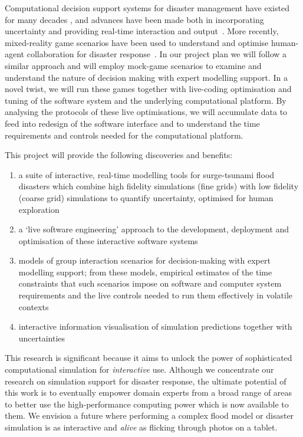 Computational decision support systems for disaster management have
existed for many decades \parencite{wallaceDecision1985}, and
advances have been made both in incorporating
uncertainty \parencite{thompsonSocial2014,nealeNavigating2015}
and providing real-time interaction and
output~\parencite{yuSupport2006}. More recently, mixed-reality game
scenarios have been used to understand and optimise human-agent
collaboration for disaster response~\parencite{ramchurn2016human}. In
our project plan we will follow a similar approach and will employ
mock-game scenarios to examine and understand the nature of decision
making with expert modelling support. In a novel twist, we will run
these games together with live-coding optimisation and tuning of the
software system and the underlying computational platform. By
analysing the protocols of these live optimisations, we will
accumulate data to feed into redesign of the software interface and to
understand the time requirements and controls needed for the
computational platform.

\medskip
This project will provide the following discoveries and benefits:
\begin{enumerate}

\item a suite of interactive, real-time modelling tools for
  surge-tsunami flood disasters which combine high fidelity
  simulations (fine grids) with low fidelity (coarse grid) simulations
  to quantify uncertainty, optimised for human exploration

\item a `live software engineering' approach to the development,
  deployment and optimisation of these interactive software systems

\item models of group interaction scenarios for decision-making with
  expert modelling support; from these models, empirical estimates of
  the time constraints that such scenarios impose on software
  and computer system requirements and the live controls needed to run
  them effectively in volatile contexts

\item interactive information visualisation of simulation predictions
together with uncertainties
 

\end{enumerate}

This research is significant because it aims to unlock the power of
sophisticated computational simulation for \emph{interactive} use.
Although we concentrate our research on simulation support for
disaster response, the ultimate potential of this work is to
eventually empower domain experts from a broad range of areas to
better use the high-performance computing power which is now available
to them. We envision a future where performing a complex flood model
or disaster simulation is as interactive and \emph{alive} as flicking
through photos on a tablet.


